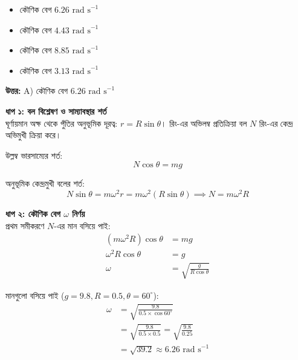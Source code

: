 \documentclass[12pt, a4paper]{article}
\begin{document}
\begin{itemize}[label={}, leftmargin=1cm, itemsep=0.5em]
    \item[\textbf{A)}] কৌণিক বেগ $6.26\text{ rad s}^{-1}$
    \item[\textbf{B)}] কৌণিক বেগ $4.43\text{ rad s}^{-1}$
    \item[\textbf{C)}] কৌণিক বেগ $8.85\text{ rad s}^{-1}$
    \item[\textbf{D)}] কৌণিক বেগ $3.13\text{ rad s}^{-1}$
\end{itemize}

\vspace{0.5em}
\begin{tcolorbox}[answerbox]
    \textbf{\color{success} উত্তর:} A) কৌণিক বেগ $6.26\text{ rad s}^{-1}$
\end{tcolorbox}
\vspace{1em}

\begin{tcolorbox}[solutionbox={সমাধান (Solution)}]
    \noindent
    \textbf{ধাপ ১: বল বিশ্লেষণ ও সাম্যাবস্থার শর্ত} \\
    ঘূর্ণায়মান অক্ষ থেকে পুঁতির অনুভূমিক দূরত্ব: $r = R \sin\theta$। 
    রিং-এর অভিলম্ব প্রতিক্রিয়া বল $N$ রিং-এর কেন্দ্র অভিমুখী ক্রিয়া করে।
    
    উল্লম্ব ভারসাম্যের শর্ত:
    \[ N \cos\theta = mg \]
    
    অনুভূমিক কেন্দ্রমুখী বলের শর্ত:
    \[ N \sin\theta = m \omega^2 r = m \omega^2 (R \sin\theta) \implies N = m \omega^2 R \]
    
    \vspace{0.5em}
    \noindent\textbf{ধাপ ২: কৌণিক বেগ $\omega$ নির্ণয়} \\
    প্রথম সমীকরণে $N$-এর মান বসিয়ে পাই:
    \begin{align*}
        (m \omega^2 R) \cos\theta &= mg \\
        \omega^2 R \cos\theta &= g \\
        \omega &= \sqrt{\frac{g}{R \cos\theta}}
    \end{align*}
    
    মানগুলো বসিয়ে পাই ($g = 9.8, R = 0.5, \theta = 60^\circ$):
    \begin{align*}
        \omega &= \sqrt{\frac{9.8}{0.5 \times \cos 60^\circ}} \\
               &= \sqrt{\frac{9.8}{0.5 \times 0.5}} = \sqrt{\frac{9.8}{0.25}} \\
               &= \sqrt{39.2} \approx \mathbf{6.26}\text{ rad s}^{-1}
    \end{align*}
\end{tcolorbox}
\end{document}
